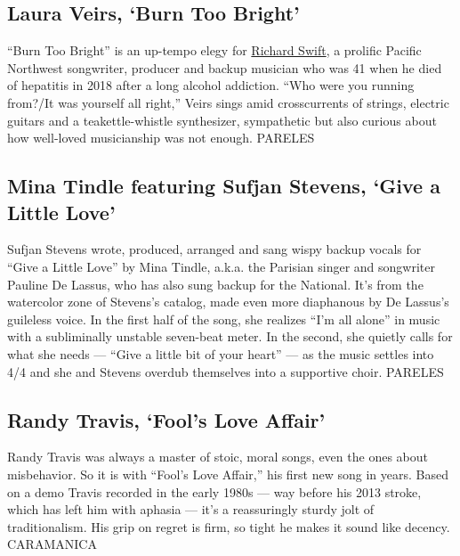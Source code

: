 \hypertarget{laura-veirs-burn-too-bright}{%
\subsection{Laura Veirs, `Burn Too
Bright'}\label{laura-veirs-burn-too-bright}}

``Burn Too Bright'' is an up-tempo elegy for
\href{https://pitchfork.com/thepitch/why-richard-swift-was-an-indie-rock-treasure/}{Richard
Swift}, a prolific Pacific Northwest songwriter, producer and backup
musician who was 41 when he died of hepatitis in 2018 after a long
alcohol addiction. ``Who were you running from?/It was yourself all
right,'' Veirs sings amid crosscurrents of strings, electric guitars and
a teakettle-whistle synthesizer, sympathetic but also curious about how
well-loved musicianship was not enough. PARELES

\hypertarget{mina-tindle-featuring-sufjan-stevens-give-a-little-love}{%
\subsection{Mina Tindle featuring Sufjan Stevens, `Give a Little
Love'}\label{mina-tindle-featuring-sufjan-stevens-give-a-little-love}}

Sufjan Stevens wrote, produced, arranged and sang wispy backup vocals
for ``Give a Little Love'' by Mina Tindle, a.k.a. the Parisian singer
and songwriter Pauline De Lassus, who has also sung backup for the
National. It's from the watercolor zone of Stevens's catalog, made even
more diaphanous by De Lassus's guileless voice. In the first half of the
song, she realizes ``I'm all alone'' in music with a subliminally
unstable seven-beat meter. In the second, she quietly calls for what she
needs --- ``Give a little bit of your heart'' --- as the music settles
into 4/4 and she and Stevens overdub themselves into a supportive choir.
PARELES

\hypertarget{randy-travis-fools-love-affair}{%
\subsection{Randy Travis, `Fool's Love
Affair'}\label{randy-travis-fools-love-affair}}

Randy Travis was always a master of stoic, moral songs, even the ones
about misbehavior. So it is with ``Fool's Love Affair,'' his first new
song in years. Based on a demo Travis recorded in the early 1980s ---
way before his 2013 stroke, which has left him with aphasia --- it's a
reassuringly sturdy jolt of traditionalism. His grip on regret is firm,
so tight he makes it sound like decency. CARAMANICA

